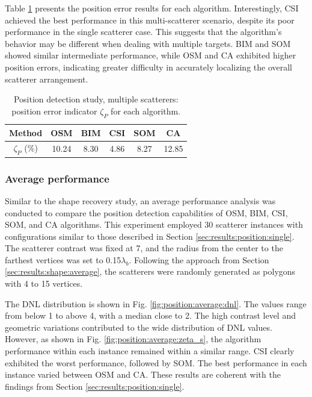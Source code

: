 \documentclass{IEEEtran}
\begin{document}
                Table \ref{tab:position:multiple:zeta_p} presents the position error results for each algorithm. Interestingly, CSI achieved the best performance in this multi-scatterer scenario, despite its poor performance in the single scatterer case. This suggests that the algorithm's behavior may be different when dealing with multiple targets. BIM and SOM showed similar intermediate performance, while OSM and CA exhibited higher position errors, indicating greater difficulty in accurately localizing the overall scatterer arrangement.

                \begin{table}[!htb]
                    \centering
                    \renewcommand{\arraystretch}{1.5}
                    \caption{Position detection study, multiple scatterers: position error indicator $\zeta_P$ for each algorithm.}
                    \label{tab:position:multiple:zeta_p}
                    \begin{tabular}{cccccc}
                        Method & OSM & BIM & CSI & SOM & CA \\\hline
                        $\zeta_P$ (\%) & 10.24 & 8.30 & 4.86 & 8.27 & 12.85 \\
                    \end{tabular}   
                \end{table}
                
			\subsubsection{Average performance}\label{sec:results:position:benchmark}

                Similar to the shape recovery study, an average performance analysis was conducted to compare the position detection capabilities of OSM, BIM, CSI, SOM, and CA algorithms. This experiment employed 30 scatterer instances with configurations similar to those described in Section \ref{sec:results:position:single}. The scatterer contrast was fixed at 7, and the radius from the center to the farthest vertices was set to 0.15$\lambda_b$. Following the approach from Section \ref{sec:results:shape:average}, the scatterers were randomly generated as polygons with 4 to 15 vertices.

                The DNL distribution is shown in Fig. \ref{fig:position:average:dnl}. The values range from below 1 to above 4, with a median close to 2. The high contrast level and geometric variations contributed to the wide distribution of DNL values. However, as shown in Fig. \ref{fig:position:average:zeta_s}, the algorithm performance within each instance remained within a similar range. CSI clearly exhibited the worst performance, followed by SOM. The best performance in each instance varied between OSM and CA. These results are coherent with the findings from Section \ref{sec:results:position:single}.
\end{document}
